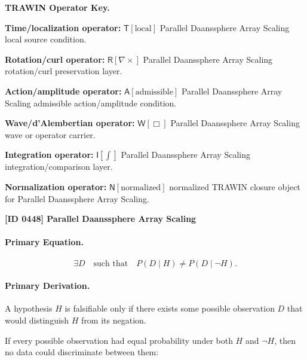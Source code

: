 \par\vspace{0.45\baselineskip}
\noindent\begin{minipage}[t]{\linewidth}
\begingroup
\small
\raggedright
\textbf{TRAWIN Operator Key.}\par
\noindent\textbf{Time/localization operator:} $\mathsf{T}\!\left[\mathrm{local}\right]$ Parallel Daanssphere Array Scaling local source condition.\par
\noindent\textbf{Rotation/curl operator:} $\mathsf{R}\!\left[\nabla\times\right]$ Parallel Daanssphere Array Scaling rotation/curl preservation layer.\par
\noindent\textbf{Action/amplitude operator:} $\mathsf{A}\!\left[\mathrm{admissible}\right]$ Parallel Daanssphere Array Scaling admissible action/amplitude condition.\par
\noindent\textbf{Wave/d'Alembertian operator:} $\mathsf{W}\!\left[\Box\right]$ Parallel Daanssphere Array Scaling wave or operator carrier.\par
\noindent\textbf{Integration operator:} $\mathsf{I}\!\left[\int\right]$ Parallel Daanssphere Array Scaling integration/comparison layer.\par
\noindent\textbf{Normalization operator:} $\mathsf{N}\!\left[\mathrm{normalized}\right]$ normalized TRAWIN closure object for Parallel Daanssphere Array Scaling.\par
\endgroup
\end{minipage}

\clearpage
\noindent\textbf{[ID 0448] Parallel Daanssphere Array Scaling}\par
\vspace{0.35em}
\paragraph{Primary Equation.}
\begin{equation}
\exists D
\quad\text{such that}\quad
P(D\mid H)\neq P(D\mid \neg H).
\end{equation}

\paragraph{Primary Derivation.}
A hypothesis $H$ is falsifiable only if there exists some possible observation $D$ that would distinguish $H$ from its negation.

If every possible observation had equal probability under both $H$ and $\neg H$, then no data could discriminate between them:

